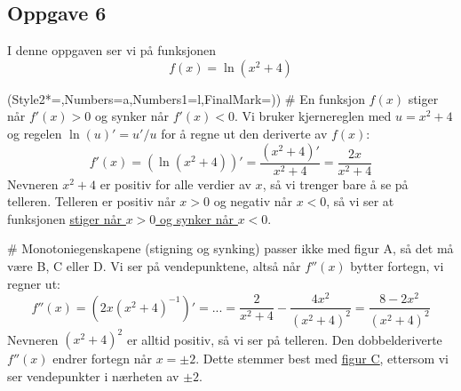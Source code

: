 \documentclass[12pt, a4paper]
{article}						%
\def\answer#1{\underline{\underline{#1}}}
\begin{document}
\subsection*{Oppgave 6}
I denne oppgaven ser vi på funksjonen
\begin{equation*}
	f(x) = \ln \left(x^2 + 4\right)
\end{equation*}
\begin{easylist}[enumerate]
	\ListProperties(Style2*=,Numbers=a,Numbers1=l,FinalMark={)})
	# En funksjon $f(x)$ stiger når $f'(x)>0$ og synker når $f'(x)<0$. Vi bruker kjernereglen med $u = x^2 + 4$ og regelen $\ln(u)' = u' / u$ for å regne ut den deriverte av $f(x)$:
	\begin{equation*}
		f'(x) = \left( \ln \left(x^2 + 4\right) \right)' = \frac{\left(x^2 + 4\right)'}{x^2 + 4} =  \frac{2x}{x^2 + 4}
	\end{equation*}
	Nevneren $x^2 + 4$ er positiv for alle verdier av $x$, så vi trenger bare å se på telleren. Telleren er positiv når $x > 0$ og negativ når $x < 0$, så vi ser at funksjonen  \answer{stiger når $x > 0$ og synker når $x < 0$}.
	
	# Monotoniegenskapene (stigning og synking) passer ikke med figur A, så det må være B, C eller D.
	Vi ser på vendepunktene, altså når $f''(x)$ bytter fortegn, vi regner ut:
	\begin{equation*}
	f''(x) = \left(  2x  \left( x^2 + 4 \right)^{-1}  \right)' = ... = \frac{2}{x^2 + 4} - \frac{4x^2}{\left(x^2 + 4\right)^2} = \frac{ 8 -2x^2}{\left(x^2 + 4\right)^2}
	\end{equation*}
	Nevneren $\left(x^2 + 4\right)^2$ er alltid positiv, så vi ser på telleren. Den dobbelderiverte $f''(x)$ endrer fortegn når $x = \pm 2$. Dette stemmer best med \answer{figur C}, ettersom vi ser vendepunkter i nærheten av $\pm 2$.
\end{easylist}
\end{document}
